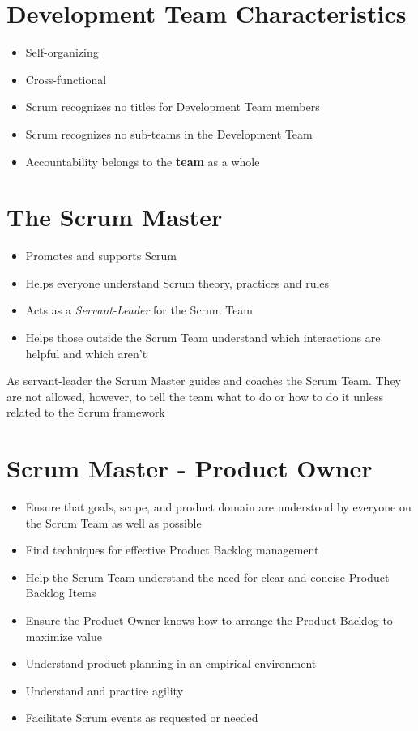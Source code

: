 \documentclass[a4paper,11pt,twocolumn]{article}
\begin{document}
\section*{Development Team Characteristics}
\begin{itemize}
    \item Self-organizing
    \item Cross-functional
	\item Scrum recognizes no titles for Development Team members
	\item Scrum recognizes no sub-teams in the Development Team
	\item Accountability belongs to the \textbf{team} as a whole
\end{itemize}

\section*{The Scrum Master}
\begin{itemize}
    \item Promotes and supports Scrum
    \item Helps everyone understand Scrum theory, practices and rules 
    \item Acts as a \textit{Servant-Leader} for the Scrum Team
    \item Helps those outside the Scrum Team understand which interactions are helpful and which aren't
\end{itemize}

\begin{tcolorbox}[colback=black!8!white,colframe=gray!50!black,title=Note,sharp corners,fonttitle=\normalsize\bfseries,fontupper=\normalsize,left=0.7em,right=0.7em]
	As servant-leader the Scrum Master guides and coaches the Scrum Team. They are not allowed, however, to tell the team what to do or how to do it unless related to the Scrum framework
\end{tcolorbox}

\section*{Scrum Master - Product Owner}
\begin{itemize}
    \item Ensure that goals, scope, and product domain are understood by everyone on the Scrum Team as well as possible
    \item Find techniques for effective Product Backlog management
    \item Help the Scrum Team understand the need for clear and concise Product Backlog Items
    \item Ensure the Product Owner knows how to arrange the Product Backlog to maximize value
    \item Understand product planning in an empirical environment
    \item Understand and practice agility
    \item Facilitate Scrum events as requested or needed
\end{itemize}
\end{document}
